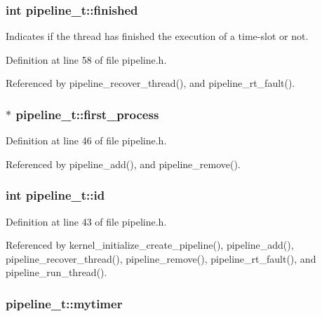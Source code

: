 \subsubsection[{finished}]{\setlength{\rightskip}{0pt plus 5cm}int pipeline\-\_\-t\-::finished}\label{structpipeline__t_a676e2ef00113a6da513d70007858628b}
Indicates if the thread has finished the execution of a time-\/slot or not. 

Definition at line 58 of file pipeline.\-h.



Referenced by pipeline\-\_\-recover\-\_\-thread(), and pipeline\-\_\-rt\-\_\-fault().

\subsubsection[{first\-\_\-process}]{$\ast$ pipeline\-\_\-t\-::first\-\_\-process}\label{structpipeline__t_a6bb54a0cd8dde618972cdcd629503979}


Definition at line 46 of file pipeline.\-h.



Referenced by pipeline\-\_\-add(), and pipeline\-\_\-remove().

\subsubsection[{id}]{\setlength{\rightskip}{0pt plus 5cm}int pipeline\-\_\-t\-::id}\label{structpipeline__t_a4d67080f7085c575d347d1ed5203a2ff}


Definition at line 43 of file pipeline.\-h.



Referenced by kernel\-\_\-initialize\-\_\-create\-\_\-pipeline(), pipeline\-\_\-add(), pipeline\-\_\-recover\-\_\-thread(), pipeline\-\_\-remove(), pipeline\-\_\-rt\-\_\-fault(), and pipeline\-\_\-run\-\_\-thread().

\subsubsection[{mytimer}]{ pipeline\-\_\-t\-::mytimer}\label{structpipeline__t_ab49193f9dbfbddaee1b5327c2ece0fb8}


